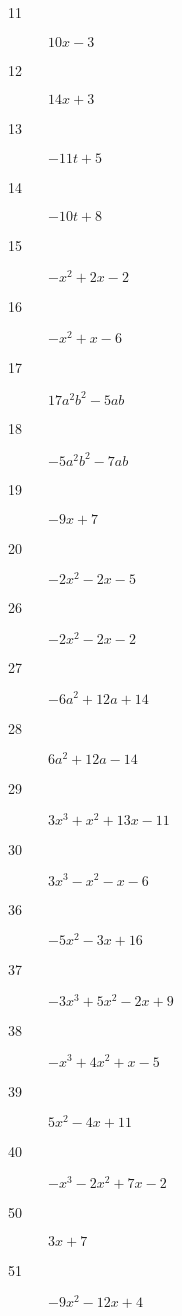 \documentclass[letterpaper, landscape]{exam}
\begin{document}
      \begin{description}

          \item[11] $10x - 3$

          \item[12] $14x + 3$

          \item[13] $-11t + 5$

          \item[14] $-10t + 8$

          \item[15] $-x^2 + 2x - 2$

          \item[16] $-x^2 + x - 6$

          \item[17] $17a^2b^2 - 5ab$

          \item[18] $-5a^2b^2 - 7ab$

          \item[19] $-9x + 7$

          \item[20] $-2x^2 -2x - 5$

          \item[26] $-2x^2 - 2x - 2$

          \item[27] $-6a^2 + 12a + 14$

          \item[28] $6a^2 + 12a - 14$

          \item[29] $3x^3 + x^2 + 13x - 11$

          \item[30] $3x^3 - x^2 - x - 6$

          \item[36] $-5x^2 -3x + 16$

          \item[37] $-3x^3 + 5x^2 - 2x + 9$

          \item[38] $-x^3 + 4x^2 + x - 5$

          \item[39] $5x^2 - 4x + 11$

          \item[40] $-x^3 - 2x^2 + 7x - 2$

          \item[50] $3x + 7$

          \item[51] $-9x^2 -12x + 4$


\end{description}
\end{document}
